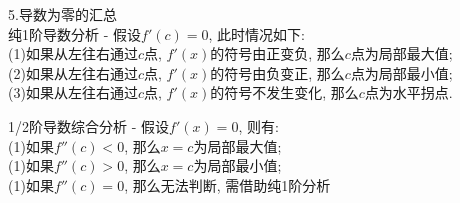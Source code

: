 5.导数为零的汇总\\
纯1阶导数分析 - 假设$f'(c)=0$, 此时情况如下:\\
(1)如果从左往右通过$c$点, $f'(x)$的符号由正变负, 那么$c$点为局部最大值;\\
(2)如果从左往右通过$c$点, $f'(x)$的符号由负变正, 那么$c$点为局部最小值;\\
(3)如果从左往右通过$c$点, $f'(x)$的符号不发生变化, 那么$c$点为水平拐点.

1/2阶导数综合分析 - 假设$f'(x)=0$, 则有:\\
(1)如果$f''(c)<0$, 那么$x=c$为局部最大值;\\
(1)如果$f''(c)>0$, 那么$x=c$为局部最小值;\\
(1)如果$f''(c)=0$, 那么无法判断, 需借助纯1阶分析\\
